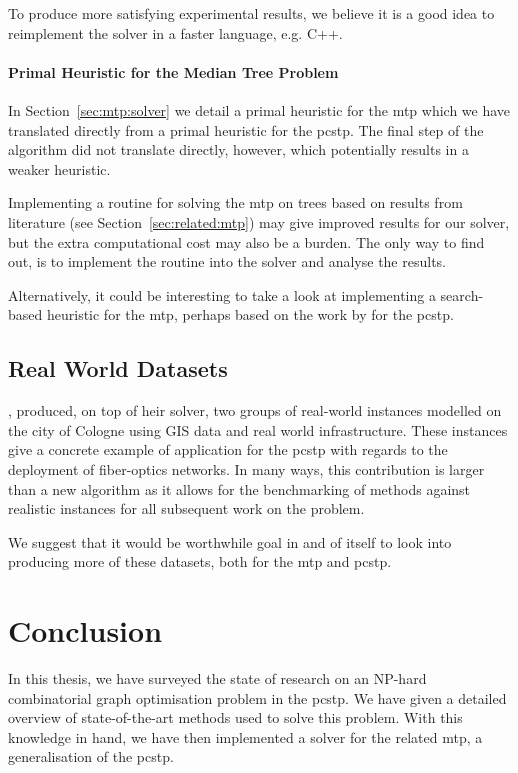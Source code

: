 To produce more satisfying experimental results, we believe it is a good idea to reimplement
the solver in a faster language, e.g. C++.

\paragraph{Primal Heuristic for the Median Tree Problem}
In Section~\ref{sec:mtp:solver} we detail a primal heuristic for the \gls{mtp}
which we have translated directly from a primal heuristic for the \gls{pcstp}.
The final step of the algorithm did not translate directly, however, which potentially
results in a weaker heuristic.

Implementing a routine for solving the \gls{mtp} on trees based on results from literature
(see Section~\ref{sec:related:mtp}) may give improved results for our solver,
but the extra computational cost may also be a burden. The only way to find out, is
to implement the routine into the solver and analyse the results.

Alternatively, it could be interesting to take a look at implementing a search-based
heuristic for the \gls{mtp}, perhaps based on the work by \citet{canuto2001local}
for the \gls{pcstp}.

\subsection{Real World Datasets}
\citet{ljubic2006algorithmic}, produced, on top of heir solver,
two groups of real-world
instances modelled on the city of Cologne using GIS data and real world infrastructure.
These instances give a concrete example of application for the \gls{pcstp} with regards
to the deployment of fiber-optics networks.
In many ways, this contribution is larger than
a new algorithm as it allows for the benchmarking of methods against realistic instances
for all subsequent work on the problem.

We suggest that it would be worthwhile goal in and of itself to look into
producing more of these
datasets, both for the \gls{mtp} and \gls{pcstp}.

\section{Conclusion}\label{sec:con:con}
In this thesis, we have surveyed the state of research on
an NP-hard combinatorial graph optimisation problem in
the \acrlong{pcstp}. We have given a detailed overview of state-of-the-art
methods used to solve this problem.
With this knowledge in hand, we have then implemented a solver for the related
\acrlong{mtp}, a generalisation of the \gls{pcstp}.

